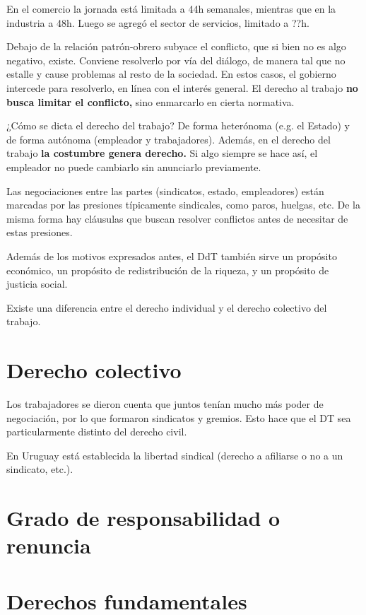 \documentclass[../main.tex]{subfiles}
\begin{document}
En el comercio la jornada está limitada a 44h semanales, mientras que en la industria a 48h.
Luego se agregó el sector de servicios, limitado a ??h.

Debajo de la relación patrón-obrero subyace el conflicto, que si bien no es algo negativo, existe.
Conviene resolverlo por vía del diálogo, de manera tal que no estalle y cause problemas al resto de la sociedad.
En estos casos, el gobierno intercede para resolverlo, en línea con el interés general.
El derecho al trabajo \textbf{no busca limitar el conflicto,} sino enmarcarlo en cierta normativa.

¿Cómo se dicta el derecho del trabajo?
De forma heterónoma (e.g. el Estado) y de forma autónoma (empleador y trabajadores).
Además, en el derecho del trabajo \textbf{la costumbre genera derecho.}
Si algo siempre se hace así, el empleador no puede cambiarlo sin anunciarlo previamente.

Las negociaciones entre las partes (sindicatos, estado, empleadores) están marcadas por las presiones típicamente sindicales, como paros, huelgas, etc.
De la misma forma hay cláusulas que buscan resolver conflictos antes de necesitar de estas presiones.

Además de los motivos expresados antes, el DdT también sirve un propósito económico, un propósito de redistribución de la riqueza, y un propósito de justicia social.

Existe una diferencia entre el derecho individual y el derecho colectivo del trabajo.

\section{Derecho colectivo}

Los trabajadores se dieron cuenta que juntos tenían mucho más poder de negociación, por lo que formaron sindicatos y gremios.
Esto hace que el DT sea particularmente distinto del derecho civil.

En Uruguay está establecida la libertad sindical (derecho a afiliarse o no a un sindicato, etc.).

\section{Grado de responsabilidad o renuncia}

\section{Derechos fundamentales}
\end{document}
